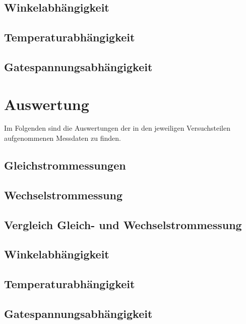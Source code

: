 \documentclass[12pt,a4paper]{article}
\begin{document}
	\subsection{Winkelabhängigkeit}
	\label{ch:winkel}
	
	\subsection{Temperaturabhängigkeit}
	\label{ch:temp}
	
	\subsection{Gatespannungsabhängigkeit}
	\label{ch:gate}
	
	
	\newpage
	\clearpage
	
	\section{Auswertung}
	\label{chap:auswertung}
	
	Im Folgenden sind die Auswertungen der in den jeweiligen Versuchsteilen aufgenommenen Messdaten zu finden. 
	
	\subsection{Gleichstrommessungen}
	\label{ch:ausw_dc}
	
	\subsection{Wechselstrommessung}
	\label{ch:ausw_ac}
	
	\subsection{Vergleich Gleich- und Wechselstrommessung}
	\label{ch:vgl_ac_dc}
	
	\subsection{Winkelabhängigkeit}
	\label{ch:ausw_winkel}
	
	\subsection{Temperaturabhängigkeit}
	\label{ch:ausw_temp}
	
	\subsection{Gatespannungsabhängigkeit}
	\label{ch:ausw_gate}
	
	
\end{document}

